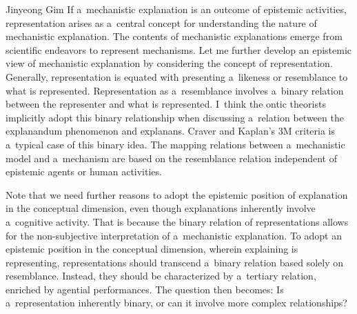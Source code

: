 \begin{artengenv}{Jinyeong Gim}
If a~mechanistic explanation is an outcome of epistemic activities, representation arises as a~central concept for understanding the nature of mechanistic explanation. The contents of mechanistic explanations emerge from scientific endeavors to represent mechanisms. Let me further develop an epistemic view of mechanistic explanation by considering the concept of representation. Generally, representation is equated with presenting a~likeness or resemblance to what is represented. Representation as a~resemblance involves a~binary relation between the representer and what is represented. I~think the ontic theorists implicitly adopt this binary relationship when discussing a~relation between the explanandum phenomenon and explanans. Craver and Kaplan's 3M criteria is a~typical case of this binary idea. The mapping relations between a~mechanistic model and a~mechanism are based on the resemblance relation independent of epistemic agents or human activities.

Note that we need further reasons to adopt the epistemic position of explanation in the conceptual dimension, even though explanations inherently involve a~cognitive activity. That is because the binary relation of representations allows for the non-subjective interpretation of a~mechanistic explanation. To adopt an epistemic position in the conceptual dimension, wherein explaining is representing, representations should transcend a~binary relation based solely on resemblance. Instead, they should be characterized by a~tertiary relation, enriched by agential performances. The question then becomes: Is a~representation inherently binary, or can it involve more complex relationships?


\end{artengenv}
